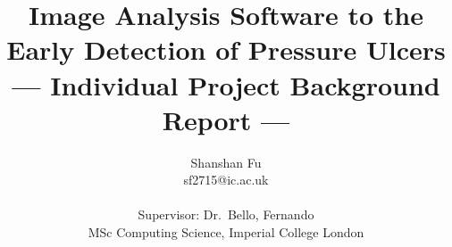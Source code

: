 \title{Image Analysis Software to the Early Detection of Pressure Ulcers\\\Large{--- Individual Project Background Report ---}}
\author{Shanshan Fu \\
       sf2715@ic.ac.uk\\ \\
       \small{Supervisor: Dr.\ Bello, Fernando}\\
       \small{MSc Computing Science, Imperial College London}
}